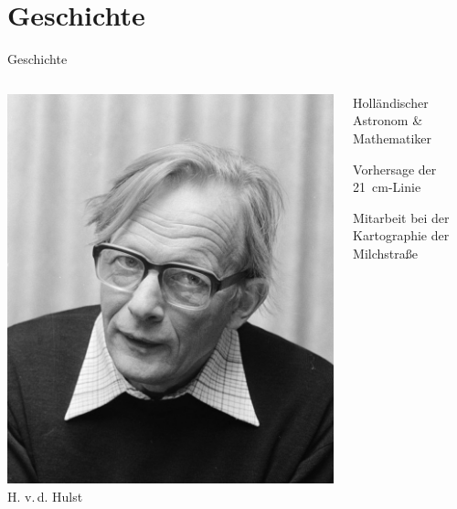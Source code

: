 \section{Geschichte}
\begin{frame}{Geschichte}%
  \begin{columns}[c, onlytextwidth]%
      \centering
      \includegraphics[width=\linewidth]{./images/Hendrik_vanDeHulst.jpg}
      \newline H. v.\,d. Hulst
      \begin{description}
        \item[Hendrik van de Hulst] Holländischer Astronom \& Mathematiker
        \item[1944] Vorhersage der \SI{21}{\centi\meter}-Linie
        \item[später] Mitarbeit bei der Kartographie der Milchstraße
      \end{description}
  \end{columns}%
  \vfill
  \begin{columns}[c, onlytextwidth]%

\end{columns}
\end{frame}
